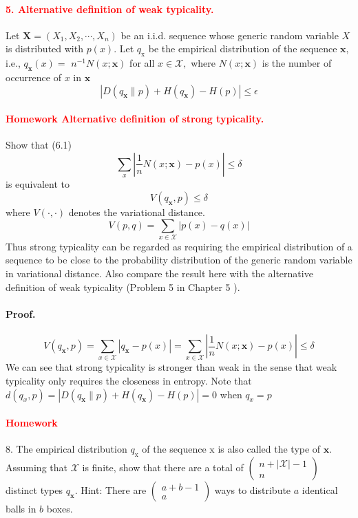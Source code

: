 \documentclass[8pt]{article}
\begin{document}
\paragraph{\textcolor{red}{5. Alternative definition of weak typicality.}}
Let $\mathbf{X}=\left(X_{1}, X_{2}, \cdots, X_{n}\right)$ be an i.i.d. sequence whose generic random variable $X$ is distributed with $p(x) .$ Let $q_{\mathrm{x}}$ be the empirical distribution of the sequence $\mathbf{x},$ i.e., $q_{\mathbf{x}}(x)=$ $n^{-1} N(x ; \mathbf{x})$ for all $x \in \mathcal{X},$ where $N(x ; \mathbf{x})$ is the number of occurrence of $x$ in $\mathbf{x}$\\
$$
\left|D\left(q_{\mathbf{x}} \| p\right)+H\left(q_{\mathbf{x}}\right)-H(p)\right| \leq \epsilon
$$


\paragraph{\textcolor{red}{Homework Alternative definition of strong typicality.}}
Show that (6.1) 
$$
\sum_{x}\left|\frac{1}{n} N(x ; \mathbf{x})-p(x)\right| \leq \delta
$$
is equivalent to
$$
V\left(q_{\mathbf{x}}, p\right) \leq \delta
$$
where $V(\cdot, \cdot)$ denotes the variational distance. 
$$
V(p, q)=\sum_{x \in \mathcal{X}}|p(x)-q(x)|
$$
Thus strong typicality can be regarded as requiring the empirical distribution of a sequence to be close to the probability distribution of the generic random variable in variational distance. Also compare the result here with the alternative definition of weak typicality (Problem 5 in Chapter 5 ).

\paragraph{Proof.}
$$
V\left(q_{\mathbf{x}}, p\right)=
\sum_{x \in \mathcal{X}}\left| q_{\mathbf{x}} -p(x)\right| = 
\sum_{x \in \mathcal{X}}\left|\frac{1}{n} N(x ; \mathbf{x})-p(x)\right|  \leq \delta
$$
We can see that strong typicality is stronger than weak in the sense that weak typicality only requires the closeness in entropy. Note that $ d(q_x, p) = 
\left|D\left(q_{\mathbf{x}} \| p\right)+H\left(q_{\mathbf{x}}\right)-H(p)\right| = 0 
$ when $q_x = p$

\paragraph{\textcolor{red}{Homework}}
8. The empirical distribution $q_{\mathrm{x}}$ of the sequence $\mathrm{x}$ is also called the type of $\mathbf{x}$. Assuming that $\mathcal{X}$ is finite, show that there are a total of $\left(\begin{array}{c}n+|\mathcal{X}|-1 \\ n\end{array}\right)$ distinct types $q_{\mathbf{x}} .$ Hint: There are $\left(\begin{array}{c}a+b-1 \\ a\end{array}\right)$ ways to distribute $a$ identical balls in $b$ boxes.
\end{document}

